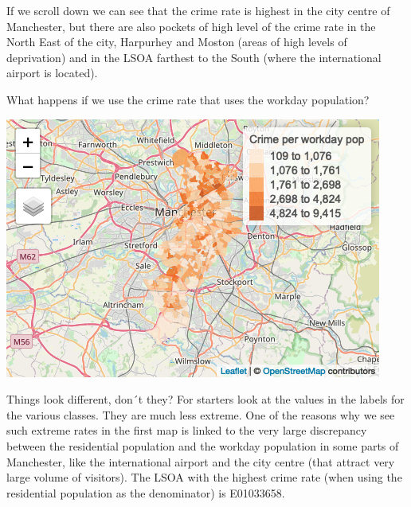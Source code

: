 \documentclass[
  krantz2]{krantz}
\makeatletter
\newenvironment{Shaded}{\begin{snugshade}}{\end{snugshade}}
\newcommand{\AttributeTok}[1]{\textcolor[rgb]{0.61,0.61,0.61}{#1}}
\newcommand{\FloatTok}[1]{\textcolor[rgb]{0.06,0.06,0.06}{#1}}
\newcommand{\FunctionTok}[1]{\textcolor[rgb]{0,0,0}{#1}}
\newcommand{\NormalTok}[1]{#1}
\newcommand{\SpecialCharTok}[1]{\textcolor[rgb]{0,0,0}{#1}}
\newcommand{\StringTok}[1]{\textcolor[rgb]{0.5,0.5,0.5}{#1}}
\newenvironment{kframe}{%
\medskip{}
\setlength{\fboxsep}{.8em}
 \def\at@end@of@kframe{}%
 \ifinner\ifhmode%
  \def\at@end@of@kframe{\end{minipage}}%
  \begin{minipage}{\columnwidth}%
 \fi\fi%
 \def\FrameCommand##1{\hskip\@totalleftmargin \hskip-\fboxsep
 \colorbox{shadecolor}{##1}\hskip-\fboxsep
     \hskip-\linewidth \hskip-\@totalleftmargin \hskip\columnwidth}%
 \MakeFramed {\advance\hsize-\width
   \@totalleftmargin\z@ \linewidth\hsize
   \@setminipage}}%
 {\par\unskip\endMakeFramed%
 \at@end@of@kframe}
\renewenvironment{Shaded}{\begin{kframe}}{\end{kframe}}
\makeatother
\begin{document}
If we scroll down we can see that the crime rate is highest in the city centre of Manchester, but there are also pockets of high level of the crime rate in the North East of the city, Harpurhey and Moston (areas of high levels of deprivation) and in the LSOA farthest to the South (where the international airport is located).

What happens if we use the crime rate that uses the workday population?

\begin{Shaded}
\end{Shaded}

\includegraphics{crime_mapping_files/figure-latex/unnamed-chunk-104-1.png}

Things look different, don´t they? For starters look at the values in the labels for the various classes. They are much less extreme. One of the reasons why we see such extreme rates in the first map is linked to the very large discrepancy between the residential population and the workday population in some parts of Manchester, like the international airport and the city centre (that attract very large volume of visitors). The LSOA with the highest crime rate (when using the residential population as the denominator) is E01033658.
\end{document}
